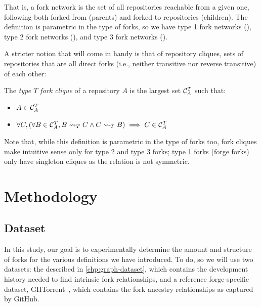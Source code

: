 That is, a fork network is the set of all repositories reachable from a given
one, following both forked from (parents) and forked to repositories
(children). The definition is parametric in the type of forks, so we have type
1 fork networks (\networkI), type 2 fork networks (\networkII), and type 3 fork
networks (\networkIII).

A stricter notion that will come in handy is that of repository cliques, sets
of repositories that are all direct forks (i.e., neither transitive nor reverse
transitive) of each other:
\begin{definition}%
  \label{def:fork-clique}
  The \emph{type $T$ fork clique} of a repository $A$ is the largest set
  $\mathcal{C}^T_A$ such that:
  \begin{itemize}
  \item $A\in\mathcal{C}^T_A$
  \item $\forall C, (\forall B \in \mathcal{C}^T_A, B\rightsquigarrow_T C \land C\rightsquigarrow_T B) \implies C\in\mathcal{C}^T_A$
  \end{itemize}
\end{definition}

Note that, while this definition is parametric in the type of forks too, fork
cliques make intuitive sense only for type 2 and type 3 forks; type 1 forks
(forge forks) only have singleton cliques as the relation is not symmetric.


\section{Methodology}%
\label{sec:forks-methodology}


\subsection{Dataset}%
\label{sec:forks-dataset}

In this study, our goal is to experimentally determine the amount and structure
of forks for the various definitions we have introduced. To do, so we will use
two datasets: the \SWHGD{} described in \cref{chp:graph-dataset}, which
contains the development history needed to find intrinsic fork relationships,
and a reference forge-specific dataset, GHTorrent~\cite{GHTorrent}, which
contains the fork ancestry relationships as captured by GitHub.

